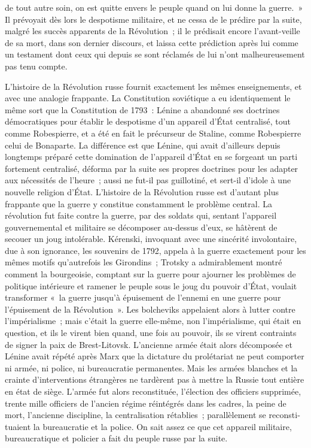 \documentclass[french,twoside]{book} %
\begin{document}
de tout autre soin, on est quitte envers le peuple quand on lui donne la guerre. » Il prévoyait dès lors le despotisme militaire, et ne cessa de le prédire par la suite, malgré les succès apparents de la Révolution ; il le prédisait encore l'avant-veille de sa mort, dans son dernier discours, et laissa cette prédiction après lui comme un testament dont ceux qui depuis se sont réclamés de lui n'ont malheureusement pas tenu compte.\par
L'histoire de la Révolution russe fournit exactement les mêmes enseigne­ments, et avec une analogie frappante. La Constitution soviétique a eu identi­quement le même sort que la Constitution de 1793 : Lénine a abandonné ses doctrines démocratiques pour établir le despotisme d'un appareil d'État centra­lisé, tout comme Robespierre, et a été en fait le précurseur de Staline, comme Robespierre celui de Bonaparte. La différence est que Lénine, qui avait d'ailleurs depuis longtemps préparé cette domination de l'appareil d'État en se forgeant un parti fortement centralisé, déforma par la suite ses propres doctri­nes pour les adapter aux nécessités de l'heure ; aussi ne fut-il pas guillotiné, et sert-il d'idole à une nouvelle religion d'État. L'histoire de la Révolution russe est d'autant plus frappante que la guerre y constitue constamment le problème central. La révolution fut faite contre la guerre, par des soldats qui, sentant l'appareil gouvernemental et militaire se décomposer au-dessus d'eux, se hâtè­rent de secouer un joug intolérable. Kérenski, invoquant avec une sincérité involontaire, due à son ignorance, les souvenirs de 1792, appela à la guerre exactement pour les mêmes motifs qu'autrefois les Girondins ; Trotsky a admirablement montré comment la bourgeoisie, comptant sur la guerre pour ajourner les problèmes de politique intérieure et ramener le peuple sous le joug du pouvoir d'État, voulait transformer « la guerre jusqu'à épuisement de l'ennemi en une guerre pour l'épuisement de la Révolution ». Les bolcheviks appelaient alors à lutter contre l'impérialisme ; mais c'était la guerre elle-même, non l'impérialisme, qui était en question, et ils le virent bien quand, une fois au pouvoir, ils se virent contraints de signer la paix de Brest-Litovsk. L'ancienne armée était alors décomposée et Lénine avait répété après Marx que la dictature du prolétariat ne peut comporter ni armée, ni police, ni bureaucratie permanentes. Mais les armées blanches et la crainte d'interven­tions étrangères ne tardèrent pas à mettre la Russie tout entière en état de siège. L'armée fut alors reconstituée, l'élection des officiers supprimée, trente mille officiers de l'ancien régime réintégrés dans les cadres, la peine de mort, l'ancienne discipline, la centralisation rétablies ; parallèlement se reconsti­tuaient la bureaucratie et la police. On sait assez ce que cet appareil militaire, bureaucratique et policier a fait du peuple russe par la suite.\par
\end{document}
